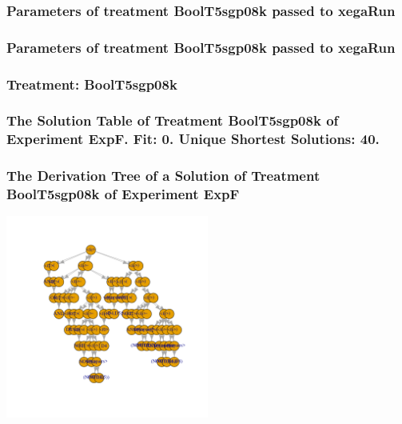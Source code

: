 \documentclass[18pt,c]{beamer}
\begin{document}

 \begin{frame}
 \fontsize{8pt}{9pt}\selectfont
 \frametitle{  Parameters of treatment BoolT5sgp08k passed to xegaRun
 }

 \label{ExpFtParmTable026.tex}  
 \end{frame}


 \begin{frame}
 \fontsize{8pt}{9pt}\selectfont
 \frametitle{  Parameters of treatment BoolT5sgp08k passed to xegaRun
 }

 \label{ExpFtParmTable027.tex}  
 \end{frame}

 \begin{frame}
 \fontsize{8pt}{9pt}\selectfont
 \frametitle{ Treatment: BoolT5sgp08k }

 \label{ExpFStatsTable012.tex}  
 \end{frame}

 \begin{frame}
 \fontsize{8pt}{9pt}\selectfont
 \frametitle{ The Solution Table of Treatment BoolT5sgp08k of Experiment ExpF. Fit: 0. Unique Shortest Solutions: 40. }

 \label{ExpFSolutionTable006.tex}  
 \end{frame}

 \begin{frame}
 \frametitle{ The Derivation Tree of a Solution of Treatment BoolT5sgp08k of Experiment ExpF }
 \begin{center}
\includegraphics[width=0.5\textwidth, angle=0]
{ExpFDerivationTreeFigure006.pdf}
 \end{center}
 \label{report/ExpFDerivationTreeFigure006.pdf}  
 \end{frame}
\end{document}
